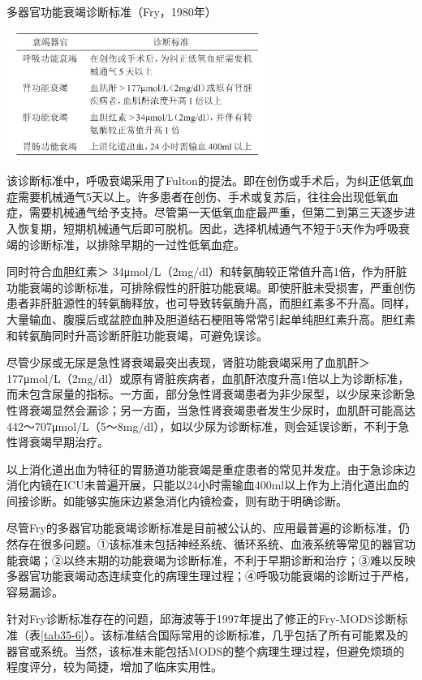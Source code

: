 \begin{table}[htbp]
\centering
\caption{多器官功能衰竭诊断标准（Fry，1980年）}
\label{tab35-5}
\includegraphics[width=3.3125in,height=1.625in]{./images/Image00137.jpg}
\end{table}

该诊断标准中，呼吸衰竭采用了Fulton的提法。即在创伤或手术后，为纠正低氧血症需要机械通气5天以上。许多患者在创伤、手术或复苏后，往往会出现低氧血症，需要机械通气给予支持。尽管第一天低氧血症最严重，但第二到第三天逐步进入恢复期，短期机械通气后即可脱机。因此，选择机械通气不短于5天作为呼吸衰竭的诊断标准，以排除早期的一过性低氧血症。

同时符合血胆红素＞
34μmol/L（2mg/dl）和转氨酶较正常值升高1倍，作为肝脏功能衰竭的诊断标准，可排除假性的肝脏功能衰竭。即使肝脏未受损害，严重创伤患者非肝脏源性的转氨酶释放，也可导致转氨酶升高，而胆红素多不升高。同样，大量输血、腹膜后或盆腔血肿及胆道结石梗阻等常常引起单纯胆红素升高。胆红素和转氨酶同时升高诊断肝脏功能衰竭，可避免误诊。

尽管少尿或无尿是急性肾衰竭最突出表现，肾脏功能衰竭采用了血肌酐＞
177μmol/L（2mg/dl）或原有肾脏疾病者，血肌酐浓度升高1倍以上为诊断标准，而未包含尿量的指标。一方面，部分急性肾衰竭患者为非少尿型，以少尿来诊断急性肾衰竭显然会漏诊；另一方面，当急性肾衰竭患者发生少尿时，血肌酐可能高达442～707μmol/L（5～8mg/dl），如以少尿为诊断标准，则会延误诊断，不利于急性肾衰竭早期治疗。

以上消化道出血为特征的胃肠道功能衰竭是重症患者的常见并发症。由于急诊床边消化内镜在ICU未普遍开展，只能以24小时需输血400ml以上作为上消化道出血的间接诊断。如能够实施床边紧急消化内镜检查，则有助于明确诊断。

尽管Fry的多器官功能衰竭诊断标准是目前被公认的、应用最普遍的诊断标准，仍然存在很多问题。①该标准未包括神经系统、循环系统、血液系统等常见的器官功能衰竭；②以终末期的功能衰竭为诊断标准，不利于早期诊断和治疗；③难以反映多器官功能衰竭动态连续变化的病理生理过程；④呼吸功能衰竭的诊断过于严格，容易漏诊。

针对Fry诊断标准存在的问题，邱海波等于1997年提出了修正的Fry-MODS诊断标准（表\ref{tab35-6}）。该标准结合国际常用的诊断标准，几乎包括了所有可能累及的器官或系统。当然，该标准未能包括MODS的整个病理生理过程，但避免烦琐的程度评分，较为简捷，增加了临床实用性。

